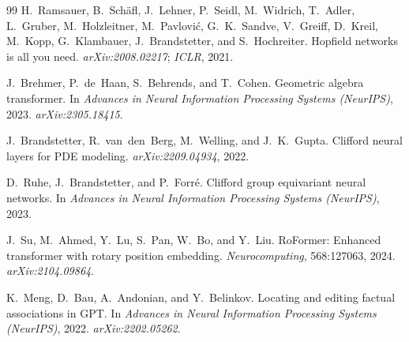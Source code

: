 \documentclass[10pt,twocolumn]{article}
\begin{document}
\begin{thebibliography}{99}
 H.~Ramsauer, B.~Sch\"afl, J.~Lehner, P.~Seidl, M.~Widrich,
T.~Adler, L.~Gruber, M.~Holzleitner, M.~Pavlovi\'c, G.~K.~Sandve, V.~Greiff,
D.~Kreil, M.~Kopp, G.~Klambauer, J.~Brandstetter, and S.~Hochreiter. Hopfield
networks is all you need. \emph{arXiv:2008.02217}; \emph{ICLR}, 2021.

 J.~Brehmer, P.~de~Haan, S.~Behrends, and T.~Cohen.
Geometric algebra transformer. In \emph{Advances in Neural Information Processing
Systems (NeurIPS)}, 2023. \emph{arXiv:2305.18415}.

 J.~Brandstetter, R.~van~den~Berg, M.~Welling, and
J.~K.~Gupta. Clifford neural layers for PDE modeling. \emph{arXiv:2209.04934}, 2022.

 D.~Ruhe, J.~Brandstetter, and P.~Forr\'e. Clifford group
equivariant neural networks. In \emph{Advances in Neural Information Processing
Systems (NeurIPS)}, 2023.

 J.~Su, M.~Ahmed, Y.~Lu, S.~Pan, W.~Bo, and Y.~Liu.
RoFormer: Enhanced transformer with rotary position embedding.
\emph{Neurocomputing}, 568:127063, 2024. \emph{arXiv:2104.09864}.

 K.~Meng, D.~Bau, A.~Andonian, and Y.~Belinkov.
Locating and editing factual associations in GPT. In \emph{Advances in Neural
Information Processing Systems (NeurIPS)}, 2022. \emph{arXiv:2202.05262}.
\end{thebibliography}
\end{document}

